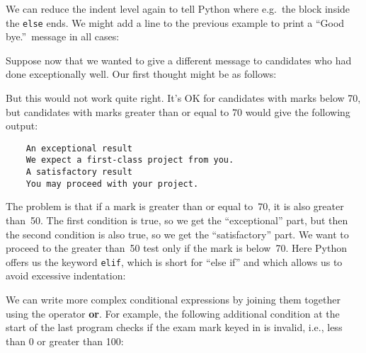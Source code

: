 We can reduce the indent level again to tell Python where e.g.\
the block inside the \verb!else! ends. We might add
a line to the previous example to print a ``Good bye.''\ message
in all cases:






Suppose now that we wanted to give a different message to candidates who
had done exceptionally well. Our first thought might be as follows:


But this would not work quite right.  It's OK for candidates with
marks below 70,
but candidates with marks greater than or equal to 70 
would give the following output:

\begin{Verbatim}
    An exceptional result
    We expect a first-class project from you.
    A satisfactory result
    You may proceed with your project.
\end{Verbatim}

The problem is that if a mark is greater than or equal to~70, it is
also greater than~50.  The first
condition is true, so we get the ``exceptional'' part, but then the second
condition is also true, so we get the ``satisfactory'' part.  We want to
proceed to the greater than~50 test only if the mark is below~70.
Here Python offers us the keyword \verb!elif!, which is short for
``else if'' and which allows us to avoid excessive indentation:


We can write more complex conditional expressions by joining them together
using the operator \textbf{or}.  For example, the following additional
condition at the start of the last program checks if the exam mark keyed in
is invalid, i.e., less than 0 or greater than 100:


